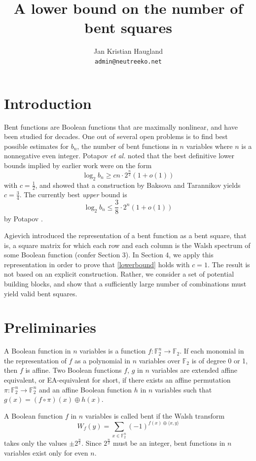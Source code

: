 \documentclass{article}
\title{A lower bound on the number of bent squares}
\author{Jan Kristian Haugland \\ \texttt{\small{admin@neutreeko.net}}}
\theoremstyle{definition}
\theoremstyle{remark}
\theoremstyle{definition}
\newcommand{\F}{\mathbb{F}}
\begin{document}
\maketitle

\section{Introduction}
Bent functions are Boolean functions that are maximally nonlinear, and have been studied for decades. One out of several open problems is to find best possible estimates for $b_n$, the number of bent functions in $n$ variables where $n$ is a nonnegative even integer. Potapov \textit{et al.} \cite{potapov} noted that the best definitive lower bounds implied by earlier work were on the form
\begin{equation}\label{lowerbound}
\operatorname{log}_2 b_n \geq c n \cdot 2^{\frac{n}{2}} (1+o(1))
\end{equation}
with $c=\frac{1}{2}$, and showed that a construction by Baksova and Tarannikov \cite{baksova} yields $c=\frac{3}{4}$. The currently best \textit{upper} bound is $$\operatorname{log}_2 b_n \leq \frac{3}{8} \cdot 2^n (1+o(1))$$ by Potapov \cite{potapov2}.

Agievich \cite{agievich} introduced the representation of a bent function as a bent square, that is, a square matrix for which each row and each column is the Walsh spectrum of some Boolean function (confer Section 3). In Section 4, we apply this representation in order to prove that \eqref{lowerbound} holds with $c=1$. The result is not based on an explicit construction. Rather, we consider a set of potential building blocks, and show that a sufficiently large number of combinations must yield valid bent squares.

\section{Preliminaries}
A Boolean function in $n$ variables is a function $f:\F_2^n \to \F_2$. If each monomial in the representation of $f$ as a polynomial in $n$ variables over $\F_2$ is of degree 0 or 1, then $f$ is affine. Two Boolean functions $f$, $g$ in $n$ variables are extended affine equivalent, or EA-equivalent for short, if there exists an affine permutation $\pi:\F_2^n \to \F_2^n$ and an affine Boolean function $h$ in $n$ variables such that $g(x) = (f \circ \pi)(x) \oplus h(x)$.

A Boolean function $f$ in $n$ variables is called bent if the Walsh transform $$W_f(y) = \sum_{x \in \F_2^n}(-1)^{f(x) \oplus \langle x, y \rangle}$$ takes only the values $\pm 2^{\frac{n}{2}}$. Since $2^{\frac{n}{2}}$ must be an integer, bent functions in $n$ variables exist only for even $n$.
\end{document}
